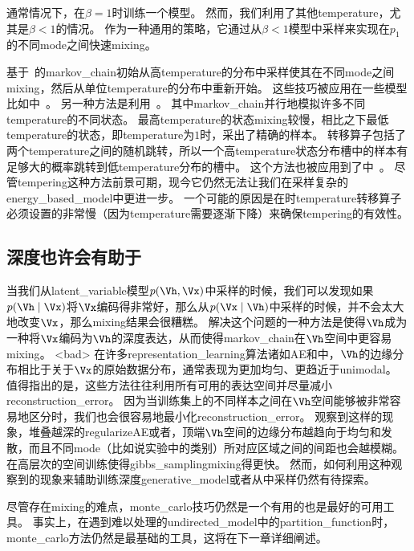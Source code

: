 通常情况下，在$\beta = 1$时训练一个模型。
然而，我们利用了其他\gls{temperature}，尤其是$\beta < 1$的情况。
作为一种通用的策略，它通过从$\beta<1$模型中采样来实现在$p_1$的不同\gls{mode}之间快速\gls{mixing}。

基于~\citep{Neal94b}的\gls{markov_chain}初始从高\gls{temperature}的分布中采样使其在不同\gls{mode}之间\gls{mixing}，然后从单位\gls{temperature}的分布中重新开始。
这些技巧被应用在一些模型比如中~\citep{Salakhutdinov-2010}。
另一种方法是利用~\citep{Iba-2001}。
其中\gls{markov_chain}并行地模拟许多不同\gls{temperature}的不同状态。
最高\gls{temperature}的状态\gls{mixing}较慢，相比之下最低\gls{temperature}的状态，即\gls{temperature}为$1$时，采出了精确的样本。
转移算子包括了两个\gls{temperature}之间的随机跳转，所以一个高\gls{temperature}状态分布槽中的样本有足够大的概率跳转到低\gls{temperature}分布的槽中。
这个方法也被应用到了中~\citep{Desjardins+al-2010-small,Cho10IJCNN}。
尽管\gls{tempering}这种方法前景可期，现今它仍然无法让我们在采样复杂的\gls{energy_based_model}中更进一步。
一个可能的原因是在时\gls{temperature}转移算子必须设置的非常慢（因为\gls{temperature}需要逐渐下降）来确保\gls{tempering}的有效性。



\subsection{深度也许会有助于}
\label{sec:depth_may_help_mixing}

当我们从\gls{latent_variable}模型$p(\Vh,\Vx)$中采样的时候，我们可以发现如果$p(\Vh\mid \Vx)$将$\Vx$编码得非常好，那么从$p(\Vx \mid \Vh)$中采样的时候，并不会太大地改变$\Vx$，那么\gls{mixing}结果会很糟糕。
解决这个问题的一种方法是使得$\Vh$成为一种将$\Vx$编码为$\Vh$的深度表达，从而使得\gls{markov_chain}在$\Vh$空间中更容易\gls{mixing}。
<bad> 在许多\gls{representation_learning}算法诸如\gls{AE}和中，$\Vh$的边缘分布相比于关于$\Vx$的原始数据分布，通常表现为更加均匀、更趋近于\gls{unimodal}。
值得指出的是，这些方法往往利用所有可用的表达空间并尽量减小\gls{reconstruction_error}。
因为当训练集上的不同样本之间在$\Vh$空间能够被非常容易地区分时，我们也会很容易地最小化\gls{reconstruction_error}。
\citet{Bengio-et-al-ICML2013-small}观察到这样的现象，堆叠越深的\gls{regularize}\gls{AE}或者，顶端$\Vh$空间的边缘分布越趋向于均匀和发散，而且不同\gls{mode}（比如说实验中的类别）所对应区域之间的间距也会越模糊。
在高层次的空间训练使得\gls{gibbs_sampling}\gls{mixing}得更快。
然而，如何利用这种观察到的现象来辅助训练深度\gls{generative_model}或者从中采样仍然有待探索。

尽管存在\gls{mixing}的难点，\gls{monte_carlo}技巧仍然是一个有用的也是最好的可用工具。
事实上，在遇到难以处理的\gls{undirected_model}中的\gls{partition_function}时，\gls{monte_carlo}方法仍然是最基础的工具，这将在下一章详细阐述。












